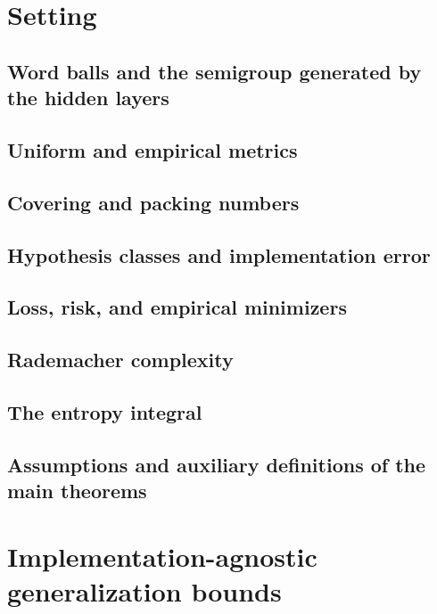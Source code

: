 \chapter{Setting}

\section{Word balls and the semigroup generated by the hidden layers}

\section{Uniform and empirical metrics}

\section{Covering and packing numbers}

\section{Hypothesis classes and implementation error}

\section{Loss, risk, and empirical minimizers}

\section{Rademacher complexity}

\section{The entropy integral}

\section{Assumptions and auxiliary definitions of the main theorems}

\chapter{Implementation-agnostic generalization bounds}


